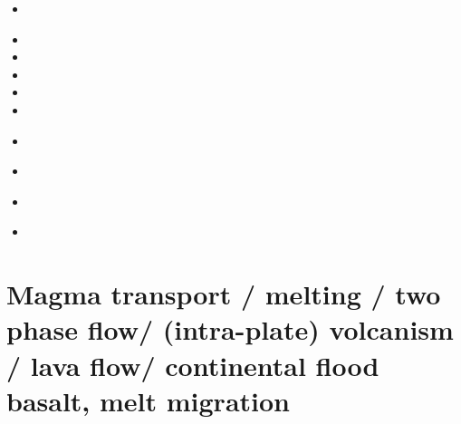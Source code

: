 \begin{scriptsize}
\begin{itemize}
\item[\nineteenninetythree] 
 \\
\item[\twothousandtwo] 
\item[\twothousandsix] 
\item[\twothousandseven] 
\item[\twothousandten] 
\item[\twothousandtwelve] 
\item[\twothousandthirteen] 
 \\
\item[\twothousandfifteen] 
\item[\twothousandtwenty] 
 \\
\item[\twothousandtwentythree] 
\end{itemize}
\end{scriptsize}

\section{Magma transport / melting / two phase flow/ (intra-plate) volcanism / lava flow/ 
continental flood basalt, melt migration}

